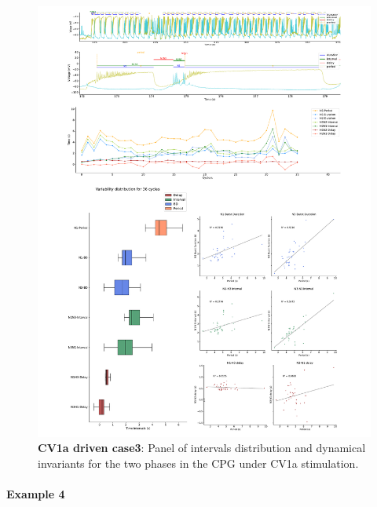\begin{figure}[htbp]
	\centering
	\includegraphics[width=1.1\textwidth]{./invariants/data/SUSSEX/CV1a_driven3/images/panel_with_intervals.pdf}
	\caption{\textbf{CV1a driven case3}: Panel of intervals distribution and dynamical invariants for the two phases in the CPG under CV1a stimulation.}
	\label{fig:cv1a 3 2phases}
\end{figure}



\paragraph{\large{Example 4}}

